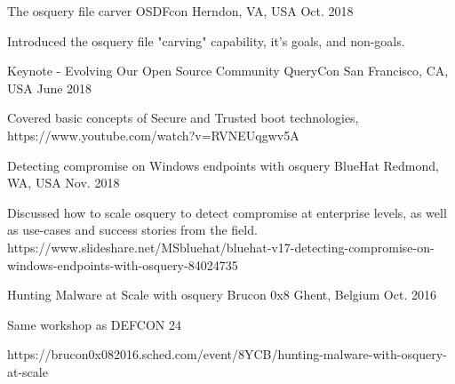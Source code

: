 


\begin{cventries}


\cventry
{The osquery file carver} %
{OSDFcon} %
{Herndon, VA, USA} %
{Oct. 2018} %
{ %
\begin{cvitems}
\item {Introduced the osquery file "carving" capability, it's goals, and non-goals.}
\end{cvitems}
}


\cventry
{Keynote - Evolving Our Open Source Community} %
{QueryCon} %
{San Francisco, CA, USA} %
{June 2018} %
{ %
\begin{cvitems}
\item {Covered basic concepts of Secure and Trusted boot technologies, https://www.youtube.com/watch?v=RVNEUqgwv5A}
\end{cvitems}
}


\cventry
{Detecting compromise on Windows endpoints with osquery} %
{BlueHat} %
{Redmond, WA, USA} %
{Nov. 2018} %
{ %
\begin{cvitems}
\item {Discussed how to scale osquery to detect compromise at enterprise levels, as well as use-cases and success stories from the field. https://www.slideshare.net/MSbluehat/bluehat-v17-detecting-compromise-on-windows-endpoints-with-osquery-84024735}
\end{cvitems}
}


\cventry
{Hunting Malware at Scale with osquery} %
{Brucon 0x8} %
{Ghent, Belgium} %
{Oct. 2016} %
{ %
\begin{cvitems}
\item {Same workshop as DEFCON 24}
\item { https://brucon0x082016.sched.com/event/8YCB/hunting-malware-with-osquery-at-scale}
\end{cvitems}
}


\end{cventries}
